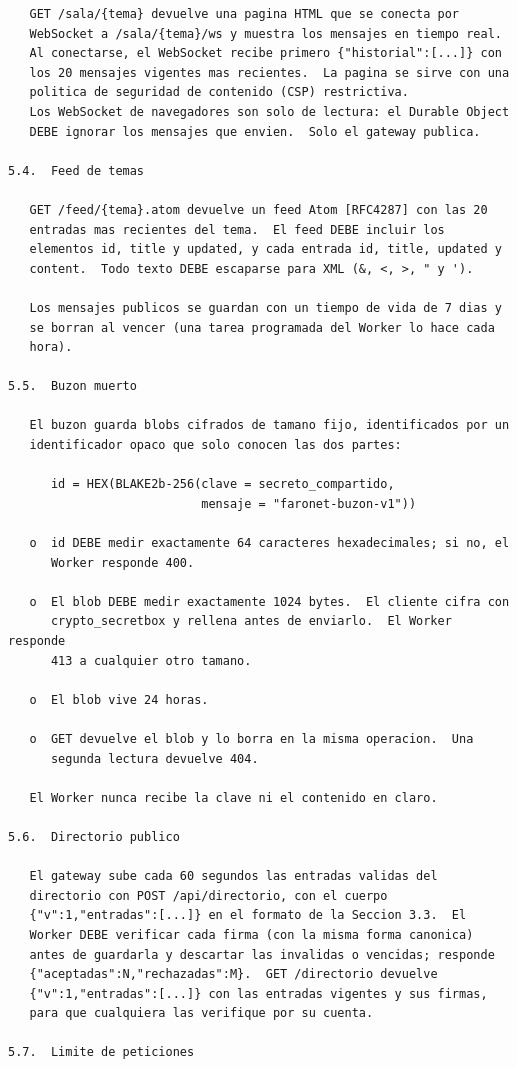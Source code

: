 \newpage
\begin{Verbatim}
   GET /sala/{tema} devuelve una pagina HTML que se conecta por
   WebSocket a /sala/{tema}/ws y muestra los mensajes en tiempo real.
   Al conectarse, el WebSocket recibe primero {"historial":[...]} con
   los 20 mensajes vigentes mas recientes.  La pagina se sirve con una
   politica de seguridad de contenido (CSP) restrictiva.
   Los WebSocket de navegadores son solo de lectura: el Durable Object
   DEBE ignorar los mensajes que envien.  Solo el gateway publica.

5.4.  Feed de temas

   GET /feed/{tema}.atom devuelve un feed Atom [RFC4287] con las 20
   entradas mas recientes del tema.  El feed DEBE incluir los
   elementos id, title y updated, y cada entrada id, title, updated y
   content.  Todo texto DEBE escaparse para XML (&, <, >, " y ').

   Los mensajes publicos se guardan con un tiempo de vida de 7 dias y
   se borran al vencer (una tarea programada del Worker lo hace cada
   hora).

5.5.  Buzon muerto

   El buzon guarda blobs cifrados de tamano fijo, identificados por un
   identificador opaco que solo conocen las dos partes:

      id = HEX(BLAKE2b-256(clave = secreto_compartido,
                           mensaje = "faronet-buzon-v1"))

   o  id DEBE medir exactamente 64 caracteres hexadecimales; si no, el
      Worker responde 400.

   o  El blob DEBE medir exactamente 1024 bytes.  El cliente cifra con
      crypto_secretbox y rellena antes de enviarlo.  El Worker responde
      413 a cualquier otro tamano.

   o  El blob vive 24 horas.

   o  GET devuelve el blob y lo borra en la misma operacion.  Una
      segunda lectura devuelve 404.

   El Worker nunca recibe la clave ni el contenido en claro.

5.6.  Directorio publico

   El gateway sube cada 60 segundos las entradas validas del
   directorio con POST /api/directorio, con el cuerpo
   {"v":1,"entradas":[...]} en el formato de la Seccion 3.3.  El
   Worker DEBE verificar cada firma (con la misma forma canonica)
   antes de guardarla y descartar las invalidas o vencidas; responde
   {"aceptadas":N,"rechazadas":M}.  GET /directorio devuelve
   {"v":1,"entradas":[...]} con las entradas vigentes y sus firmas,
   para que cualquiera las verifique por su cuenta.

5.7.  Limite de peticiones
\end{Verbatim}
